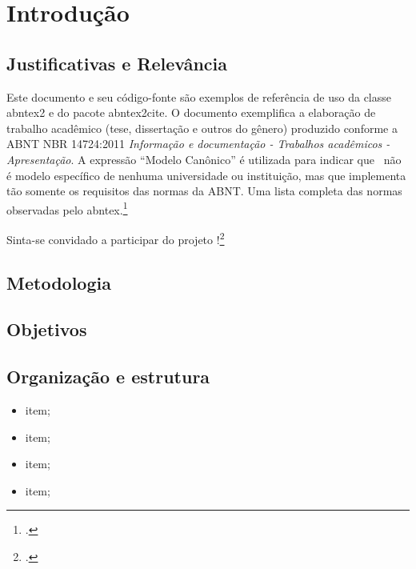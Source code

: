 \chapter[Introdução]{Introdução}

\section{Justificativas e Relev{\^a}ncia}
%
Este documento e seu código-fonte são exemplos de referência de uso da classe
\textsf{abntex2} e do pacote \textsf{abntex2cite}. O documento 
exemplifica a elaboração de trabalho acadêmico (tese, dissertação e outros do
gênero) produzido conforme a ABNT NBR 14724:2011 \emph{Informação e documentação
- Trabalhos acadêmicos - Apresentação}.
A expressão ``Modelo Canônico'' é utilizada para indicar que \abnTeX\ não é
modelo específico de nenhuma universidade ou instituição, mas que implementa tão
somente os requisitos das normas da ABNT. Uma lista completa das normas
observadas pelo abntex.\footcite{boyle1772}

Sinta-se convidado a participar do projeto \abnTeX!\footcite{herao}
%
\section{Metodologia}

\lipsum[1]

\section{Objetivos}

\lipsum[7]

\lipsum[8]

\section{Organiza{\c c}{\~a}o e estrutura}

\lipsum*[9-11]

\begin{itemize}
\item item;
\item item;
\item item;
\item item;
\end{itemize}

